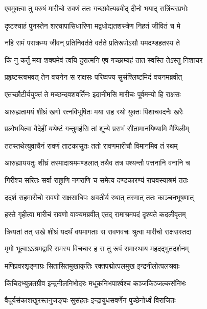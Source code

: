 
\twolineshloka
{एवमुक्त्वा तु परुषं मारीचो रावणं ततः}
{गच्छावेत्यब्रवीद् दीनो भयाद् रात्रिंचरप्रभोः} %

\twolineshloka
{दृष्टश्चाहं पुनस्तेन शरचापासिधारिणा}
{मद्वधोद्यतशस्त्रेण निहतं जीवितं च मे} %

\twolineshloka
{नहि रामं पराक्रम्य जीवन् प्रतिनिवर्तते}
{वर्तते प्रतिरूपोऽसौ यमदण्डहतस्य ते} %

\twolineshloka
{किं नु कर्तुं मया शक्यमेवं त्वयि दुरात्मनि}
{एष गच्छाम्यहं तात स्वस्ति तेऽस्तु निशाचर} %

\twolineshloka
{प्रहृष्टस्त्वभवत् तेन वचनेन स राक्षसः}
{परिष्वज्य सुसंश्लिष्टमिदं वचनमब्रवीत्} %

\twolineshloka
{एतच्छौटीर्ययुक्तं ते मच्छन्दवशवर्तिनः}
{इदानीमसि मारीचः पूर्वमन्यो हि राक्षसः} %

\twolineshloka
{आरुह्यतामयं शीघ्रं खगो रत्नविभूषितः}
{मया सह रथो युक्तः पिशाचवदनैः खरैः} %

\twolineshloka
{प्रलोभयित्वा वैदेहीं यथेष्टं गन्तुमर्हसि}
{तां शून्ये प्रसभं सीतामानयिष्यामि मैथिलीम्} %

\twolineshloka
{ततस्तथेत्युवाचैनं रावणं ताटकासुतः}
{ततो रावणमारीचौ विमानमिव तं रथम्} %

\twolineshloka
{आरुह्याययतुः शीघ्रं तस्मादाश्रममण्डलात्}
{तथैव तत्र पश्यन्तौ पत्तनानि वनानि च} %

\twolineshloka
{गिरींश्च सरितः सर्वा राष्ट्राणि नगराणि च}
{समेत्य दण्डकारण्यं राघवस्याश्रमं ततः} %

\twolineshloka
{ददर्श सहमारीचो रावणो राक्षसाधिपः}
{अवतीर्य रथात् तस्मात् ततः काञ्चनभूषणात्} %

\twolineshloka
{हस्ते गृहीत्वा मारीचं रावणो वाक्यमब्रवीत्}
{एतद् रामाश्रमपदं दृश्यते कदलीवृतम्} %

\twolineshloka
{क्रियतां तत् सखे शीघ्रं यदर्थं वयमागताः}
{स रावणवचः श्रुत्वा मारीचो राक्षसस्तदा} %

\twolineshloka
{मृगो भूत्वाऽऽश्रमद्वारि रामस्य विचचार ह}
{स तु रूपं समास्थाय महदद्भुतदर्शनम्} %

\twolineshloka
{मणिप्रवरशृङ्गाग्रः सितासितमुखाकृतिः}
{रक्तपद्मोत्पलमुख इन्द्रनीलोत्पलश्रवाः} %

\twolineshloka
{किंचिदभ्युन्नतग्रीव इन्द्रनीलनिभोदरः}
{मधूकनिभपार्श्वश्च कञ्जकिञ्जल्कसंनिभः} %

\twolineshloka
{वैदूर्यसंकाशखुरस्तनुजङ्घः सुसंहतः}
{इन्द्रायुधसवर्णेन पुच्छेनोर्ध्वं विराजितः} %

